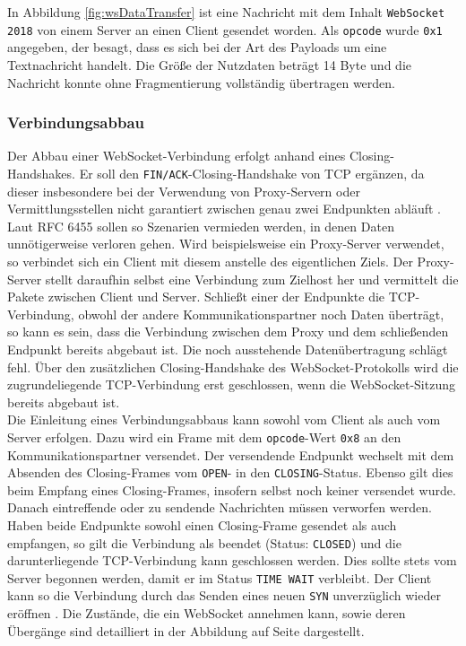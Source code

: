 \documentclass[11pt,a4paper,titlepage]{scrartcl}
\numberwithin{equation}{section}
\begin{document}
\noindent In Abbildung \ref{fig:wsDataTransfer} ist eine Nachricht mit dem Inhalt \texttt{WebSocket 2018} von einem Server an einen Client gesendet worden. Als \texttt{opcode} wurde \texttt{0x1} angegeben, der besagt, dass es sich bei der Art des Payloads um eine Textnachricht handelt. Die Größe der Nutzdaten beträgt 14 Byte und die Nachricht konnte ohne Fragmentierung vollständig übertragen werden.

\subsubsection{Verbindungsabbau}\label{subsubsec:wsClose}
Der Abbau einer WebSocket-Verbindung erfolgt anhand eines Closing-Handshakes. Er soll den \texttt{FIN/ACK}-Closing-Handshake von TCP ergänzen, da dieser insbesondere bei der Verwendung von Proxy-Servern oder Vermittlungsstellen nicht garantiert zwischen genau zwei Endpunkten abläuft \autocite[9]{fette_websocket_2011}. Laut RFC 6455 sollen so Szenarien vermieden werden, in denen Daten unnötigerweise verloren gehen. Wird beispielsweise ein Proxy-Server verwendet, so verbindet sich ein Client mit diesem anstelle des eigentlichen Ziels. Der Proxy-Server stellt daraufhin selbst eine Verbindung zum Zielhost her und vermittelt die Pakete zwischen Client und Server. Schließt einer der Endpunkte die TCP-Verbindung, obwohl der andere Kommunikationspartner noch Daten überträgt, so kann es sein, dass die Verbindung zwischen dem Proxy und dem schließenden Endpunkt bereits abgebaut ist. Die noch ausstehende Datenübertragung schlägt fehl. Über den zusätzlichen Closing-Handshake des WebSocket-Protokolls wird die zugrundeliegende TCP-Verbindung erst geschlossen, wenn die WebSocket-Sitzung bereits abgebaut ist.\\

\noindent Die Einleitung eines Verbindungsabbaus kann sowohl vom Client als auch vom Server erfolgen. Dazu wird ein Frame mit dem \texttt{opcode}-Wert \texttt{0x8} an den Kommunikationspartner versendet. Der versendende Endpunkt wechselt mit dem Absenden des Closing-Frames vom \texttt{OPEN}- in den \texttt{CLOSING}-Status. Ebenso gilt dies beim Empfang eines Closing-Frames, insofern selbst noch keiner versendet wurde. Danach eintreffende oder zu sendende Nachrichten müssen verworfen werden. Haben beide Endpunkte sowohl einen Closing-Frame gesendet als auch empfangen, so gilt die Verbindung als beendet (Status: \texttt{CLOSED}) und die darunterliegende TCP-Verbindung kann geschlossen werden. Dies sollte stets vom Server begonnen werden, damit er im Status \texttt{TIME WAIT} verbleibt. Der Client kann so die Verbindung durch das Senden eines neuen \texttt{SYN} unverzüglich wieder eröffnen \autocite[41]{fette_websocket_2011}. Die Zustände, die ein WebSocket annehmen kann, sowie deren Übergänge sind detailliert in der Abbildung auf Seite \pageref{fig:wsLifeCycle} dargestellt. \\
\end{document}
